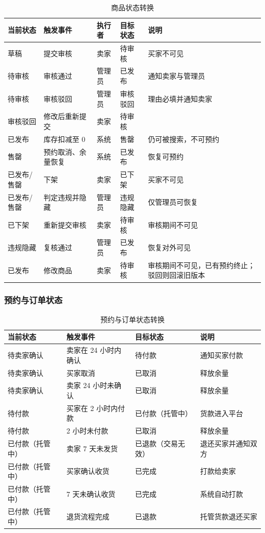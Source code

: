 \documentclass[UTF8,a4paper,zihao=-4]{ctexart}
\begin{document}
\begin{table}[H]
\centering
\caption{商品状态转换}
\begin{tabular}{p{2.8cm}p{3.0cm}p{2.8cm}p{2.4cm}p{3.4cm}}
\toprule
当前状态 & 触发事件 & 执行者 & 目标状态 & 说明 \\
\midrule
草稿 & 提交审核 & 卖家 & 待审核 & 买家不可见 \\
待审核 & 审核通过 & 管理员 & 已发布 & 通知卖家与管理员 \\
待审核 & 审核驳回 & 管理员 & 审核驳回 & 理由必填并通知卖家 \\
审核驳回 & 修改后重新提交 & 卖家 & 待审核 &  \\
已发布 & 库存扣减至 0 & 系统 & 售罄 & 仍可被搜索，不可预约 \\
售罄 & 预约取消、余量恢复 & 系统 & 已发布 & 恢复可预约 \\
已发布/售罄 & 下架 & 卖家 & 已下架 & 买家不可见 \\
已发布/售罄 & 判定违规并隐藏 & 管理员 & 违规隐藏 & 仅管理员可恢复 \\
已下架 & 重新提交审核 & 卖家 & 待审核 & 审核期间不可见 \\
违规隐藏 & 复核通过 & 管理员 & 已发布 & 恢复对外可见 \\
已发布 & 修改商品 & 卖家 & 待审核 & 审核期间不可见，已有预约终止；驳回则回滚旧版本 \\
\bottomrule
\end{tabular}
\end{table}

\subsubsection{预约与订单状态}

\begin{table}[H]
\centering
\caption{预约与订单状态转换}
\begin{tabular}{p{2.9cm}p{4.2cm}p{4.2cm}p{3.2cm}}
\toprule
当前状态 & 触发事件 & 目标状态 & 说明 \\
\midrule
待卖家确认 & 卖家在 24 小时内确认 & 待付款 & 通知买家付款 \\
待卖家确认 & 买家取消 & 已取消 & 释放余量 \\
待卖家确认 & 卖家 24 小时未确认 & 已取消 & 释放余量 \\
待付款 & 买家在 2 小时内付款 & 已付款（托管中） & 货款进入平台 \\
待付款 & 2 小时未付款 & 已取消 & 释放余量 \\
已付款（托管中） & 卖家 7 天未发货 & 已退款（交易无效） & 退还买家并通知双方 \\
已付款（托管中） & 买家确认收货 & 已完成 & 打款给卖家 \\
已付款（托管中） & 7 天未确认收货 & 已完成 & 系统自动打款 \\
已付款（托管中） & 退货流程完成 & 已退款 & 托管货款退还买家 \\
\bottomrule
\end{tabular}
\end{table}
\end{document}
